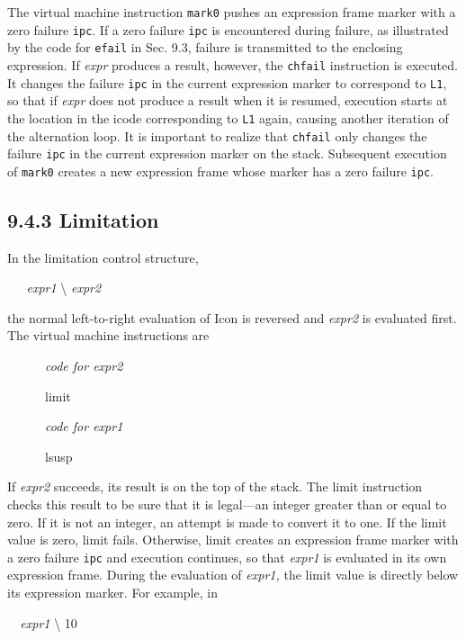 The virtual machine instruction \texttt{mark0} pushes an expression
frame marker with a zero failure \texttt{ipc}. If a zero failure
\texttt{ipc} is encountered during failure, as illustrated by the code
for \texttt{efail} in Sec. 9.3, failure is transmitted to the
enclosing expression. If \textit{expr }produces a result, however, the
\texttt{chfail} instruction is executed. It changes the failure
\texttt{ipc} in the current expression marker to correspond to
\texttt{L1}, so that if \textit{expr }does not produce a result when
it is resumed, execution starts at the location in the icode
corresponding to \texttt{L1} again, causing another iteration of the
alternation loop. It is important to realize that \texttt{chfail} only
changes the failure \texttt{ipc} in the current expression marker on
the stack.  Subsequent execution of \texttt{mark0} creates a new
expression frame whose marker has a zero failure \texttt{ipc}.

\subsection[9.4.3 Limitation]{9.4.3 Limitation}

In the limitation control structure,

{\ttfamily\mdseries
\textit{\ \ \ expr1 }{\textbackslash} \textit{expr2}}

\noindent the normal left-to-right evaluation of Icon is reversed and
\textit{expr2 }is evaluated first. The virtual machine instructions are

{\ttfamily\mdseries
\ \ \ \ \ \ \textit{code for expr2}}

{\ttfamily\mdseries
\ \ \ \ \ \ limit}

{\ttfamily\mdseries
\ \ \ \ \ \ \textit{code for expr1}}

{\ttfamily\mdseries
\ \ \ \ \ \ lsusp}

If \textit{expr2 }succeeds, its result is on the top of the stack. The
limit instruction checks this result to be sure that it is legal---an
integer greater than or equal to zero. If it is not an integer, an
attempt is made to convert it to one. If the limit value is zero,
limit fails. Otherwise, limit creates an expression frame marker with
a zero failure \texttt{ipc} and execution continues, so that
\textit{expr1 }is evaluated in its own expression frame. During the
evaluation of \textit{expr1, }the limit value is directly below its
expression marker. For example, in

{\ttfamily\mdseries
\textit{\ \ expr1 }{\textbackslash} 10}

